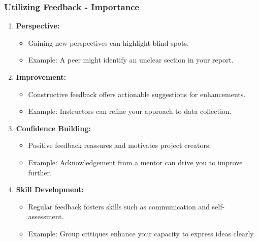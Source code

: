 \documentclass[aspectratio=169]{beamer}
\begin{document}
\begin{frame}[fragile]
    \frametitle{Utilizing Feedback - Importance}
    \begin{enumerate}
        \item \textbf{Perspective:} 
        \begin{itemize}
            \item Gaining new perspectives can highlight blind spots.
            \item Example: A peer might identify an unclear section in your report.
        \end{itemize}
        
        \item \textbf{Improvement:}
        \begin{itemize}
            \item Constructive feedback offers actionable suggestions for enhancements.
            \item Example: Instructors can refine your approach to data collection.
        \end{itemize}

        \item \textbf{Confidence Building:}
        \begin{itemize}
            \item Positive feedback reassures and motivates project creators.
            \item Example: Acknowledgement from a mentor can drive you to improve further.
        \end{itemize}

        \item \textbf{Skill Development:}
        \begin{itemize}
            \item Regular feedback fosters skills such as communication and self-assessment.
            \item Example: Group critiques enhance your capacity to express ideas clearly.
        \end{itemize}
    \end{enumerate}
\end{frame}
\end{document}

